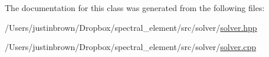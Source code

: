 The documentation for this class was generated from the following files\-:\begin{DoxyCompactItemize}
\item 
/\-Users/justinbrown/\-Dropbox/spectral\-\_\-element/src/solver/\hyperlink{solver_8hpp}{solver.\-hpp}\item 
/\-Users/justinbrown/\-Dropbox/spectral\-\_\-element/src/solver/\hyperlink{solver_8cpp}{solver.\-cpp}\end{DoxyCompactItemize}
